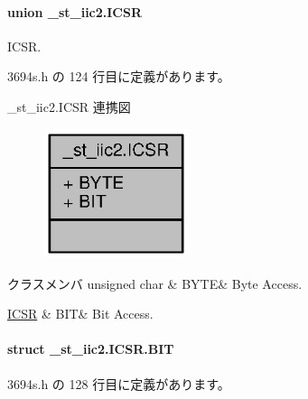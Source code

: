 \paragraph{union \+\_\+st\+\_\+iic2.\+I\+C\+S\+R}
I\+C\+S\+R. 

 3694s.\+h の 124 行目に定義があります。



\+\_\+st\+\_\+iic2.\+I\+C\+S\+R 連携図
\nopagebreak
\begin{figure}[H]
\begin{center}
\leavevmode
\includegraphics[width=121pt]{d5/dbf/union__st__iic2_8ICSR__coll__graph}
\end{center}
\end{figure}
\begin{DoxyFields}{クラスメンバ}
unsigned char\label{3694s_8h_ae409eb2ba6eb6801f52763ae370c350e}
&
B\+Y\+T\+E&
Byte Access. \\
\hline

\hyperlink{3694s_8h_dc/d5d/struct__st__iic2_8ICSR_8BIT}{I\+C\+S\+R}\label{3694s_8h_adb957fdc8000e1eef04a243f5199aa52}
&
B\+I\+T&
Bit Access. \\
\hline

\end{DoxyFields}
\label{struct__st__iic2_8ICSR_8BIT}
\paragraph{struct \+\_\+st\+\_\+iic2.\+I\+C\+S\+R.\+B\+I\+T}


 3694s.\+h の 128 行目に定義があります。



